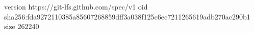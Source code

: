 version https://git-lfs.github.com/spec/v1
oid sha256:fda9272110385a85607268859dff3a038f125c6ec7211265619adb270ac290b1
size 262240
